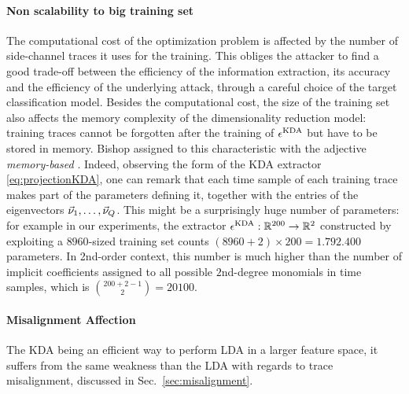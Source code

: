 \paragraph*{Non scalability to big training set} The computational cost of the optimization problem is affected by the number of side-channel traces it uses for the training. This obliges the attacker to find a good trade-off between the efficiency of the information extraction, its accuracy and the efficiency of the underlying attack, through a careful choice of the target classification model. Besides the computational cost, the size of the training set also affects the memory complexity of the dimensionality reduction model: training traces cannot be forgotten after the training of $\epsilon^{\mathrm{KDA}}$ but have to be stored in memory. Bishop assigned to this characteristic with the adjective \emph{memory-based} \cite[Chapter~6]{christopher2006pattern}. Indeed, observing the form of the KDA extractor \eqref{eq:projectionKDA}, one can remark that each time sample of each training trace makes part of the parameters defining it, together with the entries of the eigenvectors $\vec{\nu}_1, \dots, \vec{\nu}_Q$. This might be a surprisingly huge number of parameters: for example in our experiments, the extractor $\epsilon^{\mathrm{KDA}}:\mathbb{R}^{200}\rightarrow\mathbb{R}^2$ constructed by exploiting a $8960$-sized training set counts $(8960+2)\times200 = 1.792.400$ parameters. In 2nd-order context, this number is much higher than the number of implicit coefficients assigned to all possible $2$nd-degree monomials in time samples, which is ${{200+2-1}\choose{2}} = 20100$.

\paragraph*{Misalignment Affection} The KDA being an efficient way to perform LDA in a larger feature space, it suffers from the same weakness than the LDA with regards to trace misalignment, discussed in Sec.~\ref{sec:misalignment}.  
